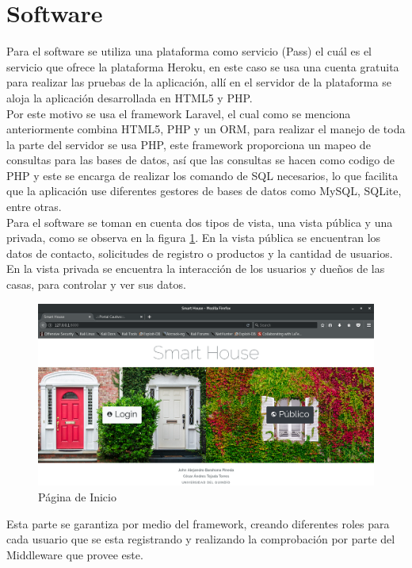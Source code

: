 \section{Software}

Para el software se utiliza una plataforma como servicio (Pass) el cuál es el servicio que ofrece la plataforma Heroku, en este caso se usa una cuenta gratuita para realizar las pruebas de la aplicación, allí en el servidor de la plataforma se aloja la aplicación desarrollada en HTML5 y PHP.\\

Por este motivo se usa el framework Laravel, el cual como se menciona anteriormente combina HTML5, PHP y un ORM, para realizar el manejo de toda la parte del servidor se usa PHP, este framework proporciona un mapeo de consultas para las bases de datos, así que las consultas se hacen como codigo de PHP y este se encarga de realizar los comando de SQL necesarios, lo que facilita que la aplicación use diferentes gestores de bases de datos como MySQL, SQLite, entre otras.\\

Para el software se toman en cuenta dos tipos de vista, una vista pública y una privada, como se observa en la figura \ref{fig:index}. En la vista pública se encuentran los datos de contacto, solicitudes de registro o productos y la cantidad de usuarios. En la vista privada se encuentra la interacción de los usuarios y dueños de las casas, para controlar y ver sus datos.\\

\begin{figure}
	\centering
	\caption{Página de Inicio}
	\label{fig:index}
	\includegraphics[width=0.9\linewidth]{Imagenes/Index}
\end{figure}


Esta parte se garantiza por medio del framework, creando diferentes roles para cada usuario que se esta registrando y realizando la comprobación por parte del Middleware que provee este.\\

